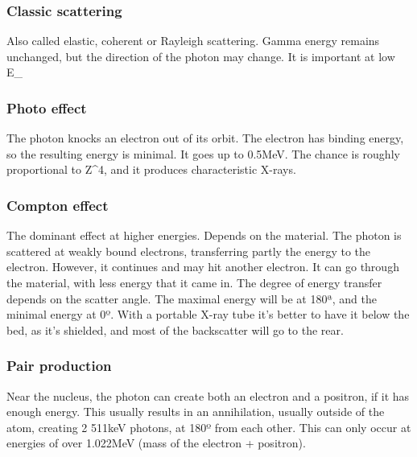 \subsubsection{Classic scattering}
Also called elastic, coherent or Rayleigh scattering.
Gamma energy remains unchanged, but the direction of the photon may change. It is important at low E_{\lambda}

\subsubsection{Photo effect}
The photon knocks an electron out of its orbit. The electron has binding energy, so the resulting energy is minimal. It goes up to 0.5MeV. The chance is roughly proportional to Z^4, and it produces characteristic X-rays.

\subsubsection{Compton effect}
The dominant effect at higher energies. Depends on the material.
The photon is scattered at weakly bound electrons, transferring partly the energy to the electron. However, it continues and may hit another electron. It can go through the material, with less energy that it came in.
The degree of energy transfer depends on the scatter angle. The maximal energy will be at 180ª, and the minimal energy at 0º. With a portable X-ray tube it's better to have it below the bed, as it's shielded, and most of the backscatter will go to the rear.

\subsubsection{Pair production}
Near the nucleus, the photon can create both an electron and a positron, if it has enough energy. This usually results in an annihilation, usually outside of the atom, creating 2 511keV photons, at 180º from each other. This can only occur at energies of over 1.022MeV (mass of the electron + positron). 

